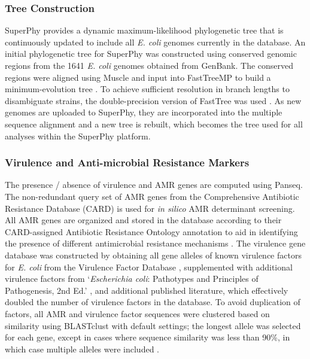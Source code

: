 \documentclass[doublespacing, linenumbers]{bmcart}
\begin{document}
\subsubsection{Tree Construction}
SuperPhy provides a dynamic maximum-likelihood phylogenetic tree that is continuously updated to include all \textit{E. coli} genomes currently in the database. An initial phylogenetic tree for SuperPhy was constructed using conserved genomic regions from the 1641 \textit{E. coli} genomes obtained from GenBank. The conserved regions were aligned using Muscle \cite{edgar_muscle_2004,edgar_muscle_2004a} and input into FastTreeMP to build a minimum-evolution tree \cite{price_fasttree_2010}. To achieve sufficient resolution in branch lengths to disambiguate strains, the double-precision version of FastTree was used \cite{price_fasttree_2010}. As new genomes are uploaded to SuperPhy, they are incorporated into the multiple sequence alignment and a new tree is rebuilt, which becomes the tree used for all analyses within the SuperPhy platform. 

\subsubsection{Virulence and Anti-microbial Resistance Markers}
The presence / absence of virulence and AMR genes are computed using Panseq. The non-redundant query set of AMR genes from the Comprehensive Antibiotic Resistance Database (CARD) \cite{mcarthur_comprehensive_2013} is used for \textit{in silico} AMR determinant screening. All AMR genes are organized and stored in the database according to their CARD-assigned Antibiotic Resistance Ontology annotation to aid in identifying the presence of different antimicrobial resistance mechanisms . The virulence gene database was constructed by obtaining all gene alleles of known virulence factors for \textit{E. coli} from the Virulence Factor Database \cite{chen_vfdb_2011}, supplemented with additional virulence factors from `\textit{Escherichia coli}: Pathotypes and Principles of Pathogenesis, 2nd Ed.'  \cite{donnenberg_escherichia_2013}, and additional published literature, which effectively doubled the number of virulence factors in the database. To avoid duplication of factors, all AMR and virulence factor sequences were clustered based on similarity using BLASTclust with default settings; the longest allele was selected for each gene, except in cases where sequence similarity was less than 90\%, in which case multiple alleles were included \cite{altschul_gapped_1997}.
\end{document}
